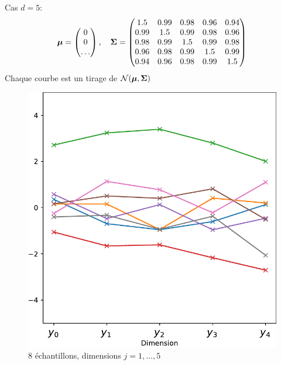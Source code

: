 \documentclass[xcolor=svgnames, t]{beamer}
\newcommand{\vectorx}[1]{\boldsymbol{\MakeLowercase{\mathbf{#1}}}}
\newcommand{\matrixx}[1]{\boldsymbol{\MakeUppercase{#1}}}
\begin{document}
\begin{frame}{\subsecname}
  Cas $d=5$:
  \begin{equation*}
    \vectorx{\mu}
    =
    \begin{pmatrix}
      0 \\
      0 \\
      \dots
    \end{pmatrix},
    \quad
    \matrixx{\Sigma}
    =
    \begin{pmatrix}
      1.5 & 0.99 & 0.98 & 0.96 & 0.94 \\
      0.99 & 1.5 & 0.99 & 0.98 & 0.96 \\
      0.98 & 0.99 & 1.5 & 0.99 & 0.98 \\
      0.96 & 0.98 & 0.99 & 1.5 & 0.99 \\
      0.94 & 0.96 & 0.98 & 0.99 & 1.5
      \end{pmatrix}
  \end{equation*}
  Chaque courbe est un tirage de $\mathcal{N}(\vectorx{\mu} , \matrixx{\Sigma})$
  \begin{figure}[ht]
    \includegraphics[scale=0.3]{gaussian_5d_valuevsindex.pdf}
    \caption{$8$ échantillons, dimensions $j=1, \dots, 5$}
  \end{figure}
\end{frame}
\end{document}
